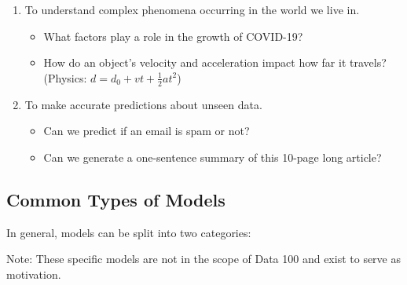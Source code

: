 \documentclass[
  letterpaper,
  DIV=11,
  numbers=noendperiod]{scrreprt}
\providecommand{\tightlist}{%
  \setlength{\itemsep}{0pt}\setlength{\parskip}{0pt}}\usepackage{longtable,booktabs,array}
\begin{document}
\begin{enumerate}
\def\labelenumi{\arabic{enumi}.}
\item
  To understand complex phenomena occurring in the world we live in.

  \begin{itemize}
  \tightlist
  \item
    What factors play a role in the growth of COVID-19?
  \item
    How do an object's velocity and acceleration impact how far it
    travels? (Physics: \(d = d_0 + vt + \frac{1}{2}at^2\))
  \end{itemize}
\item
  To make accurate predictions about unseen data.

  \begin{itemize}
  \tightlist
  \item
    Can we predict if an email is spam or not?
  \item
    Can we generate a one-sentence summary of this 10-page long article?
  \end{itemize}
\end{enumerate}

\hypertarget{common-types-of-models}{%
\subsection{Common Types of Models}\label{common-types-of-models}}

In general, models can be split into two categories:

Note: These specific models are not in the scope of Data 100 and exist
to serve as motivation.
\end{document}
